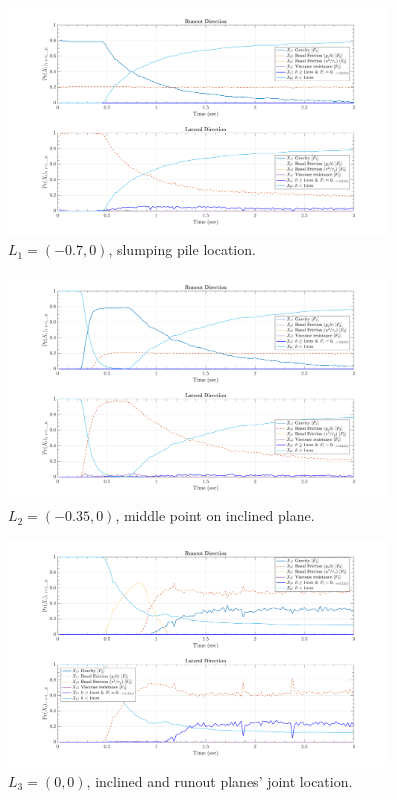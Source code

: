 \documentclass{article}
\begin{document}
\begin{figure}[H]
\centering
	\includegraphics[width=0.9\textwidth]{InclinedPlane/LocalRecords/DominancePr_x1V.png}
	\caption{$L_1=(-0.7,0)$, slumping pile location.}
	\label{fig:Ramp-Prx1V}
\end{figure}

\begin{figure}[H]
\centering
	\includegraphics[width=0.9\textwidth]{InclinedPlane/LocalRecords/DominancePr_x2V.png}
	\caption{$L_2=(-0.35,0)$, middle point on inclined plane.}
	\label{fig:Ramp-Prx2V}
\end{figure}

\begin{figure}[H]
\centering
	\includegraphics[width=0.9\textwidth]{InclinedPlane/LocalRecords/DominancePr_x3V.png}
	\caption{$L_3=(0,0)$, inclined and runout planes' joint location.}
	\label{fig:Ramp-Prx3V}
\end{figure}
\end{document}
